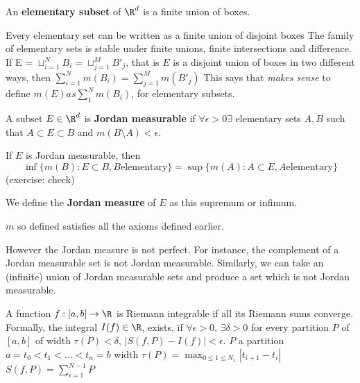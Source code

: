 \documentclass{article}
\begin{document}
\begin{defi}
    An \textbf{elementary subset} of $\R^d$ is a finite union of boxes.
\end{defi}
\begin{remark}
    Every elementary set can be written as a finite union of disjoint boxes
    The family of elementary sets is stable under finite unions, finite intersections and difference.
    If E = $\sqcup_{i=1}^N B_i = \sqcup_{j=1}^M B'_j$, that is $E$ is a disjoint union of boxes in two different ways, then
    $\sum_{i=1}^N m(B_i) = \sum_{j=1}^M m(B'_j)$
    This says that \emph{makes sense} to define $m(E) as \sum_1^N m(B_i)$, for elementary subsets.
\end{remark}

\begin{defi}
    A subset $E \in \R^d$ is \textbf{Jordan measurable} if $\forall \epsilon > 0 \exists$ elementary sets $A, B$ such that $A \subset E \subset B$ and $m(B\setminus A) < \epsilon$.
\end{defi}
\begin{remark}
    If $E$ is Jordan measurable, then
    \begin{equation}
        \inf\{m(B): E \subset B, B \mathrm{elementary}\} = \sup\{m(A): A \subset E, A \mathrm{elementary}\}
    \end{equation}
    (exercise: check)
\end{remark}
\begin{defi}
    We define the \textbf{Jordan measure} of $E$ as this supremum or infimum.
\end{defi}
\begin{exercise}
    $m$ so defined satisfies all the axioms defined earlier.
\end{exercise}
However the Jordan measure is not perfect. For instance, the complement of a Jordan measurable set is not Jordan measurable.  Similarly, we can take an (infinite) union of Jordan measurable sets and produce a set which is not Jordan measurable.

\begin{defi}
    A function $f:[a, b] \to \R$ is Riemann integrable if all its Riemann sums converge.
    Formally, the integral $I(f) \in \R$, exists, if $\forall \epsilon > 0$, $\exists \delta > 0$ for every partition $P$ of $[a, b]$ of width $\tau(P) < \delta$,
    $|S(f, P) - I(f)| < \epsilon$.
$P$ a partition $a = t_0 < t_1 < \dots < t_n = b$ width $\tau(P) = \max_{0 \leq 1 \leq N_1} |t_{i+1} - t_i|$
$S(f, P) = \sum_{i=1}^{N-1} P$
\end{defi}
\end{document}
